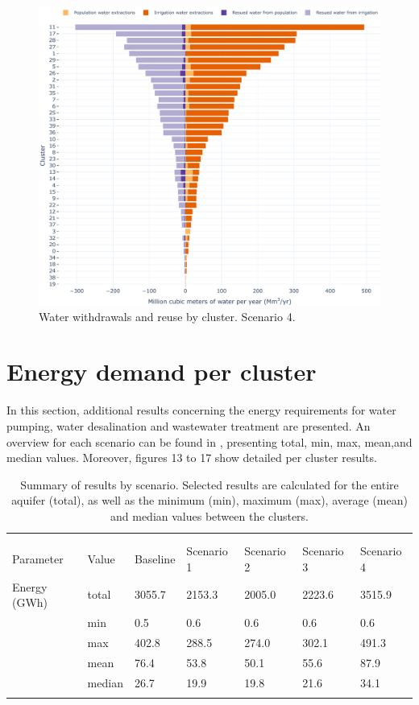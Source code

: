 \documentclass[12pt]{iopart}
\begin{document}
\begin{figure}[!h]
	\centering
	\includegraphics[width=\textwidth]{Scenario4Water}
	\caption{Water withdrawals and reuse by cluster. Scenario 4.}
	\label{fig:Scenario4Water}
\end{figure}

\clearpage
\section{Energy demand per cluster}
In this section, additional results concerning the energy requirements for water pumping, water desalination and wastewater treatment are presented. An overview for each scenario can be found in , presenting total, min, max, mean,and median values. Moreover, figures 13 to 17 show detailed per cluster results.
\begin{table}[!ht]
	\caption{\label{tbl:resultsenergy}Summary of results by scenario. Selected results are calculated for the entire aquifer (total), as well as the minimum (min), maximum (max), average (mean) and median values between the clusters.}
	\footnotesize
	\lineup
	\begin{tabular*}{\textwidth}{@{}*{7}{l}}
		\br
		&        & \centre{5}{Scenario} \\
		\ns
		&        & \crule{5} \\
		Parameter & Value  &  Baseline &  Scenario 1 &  Scenario 2 &  Scenario 3 &  Scenario 4 \\
		\mr
		Energy (GWh) & total &    3055.7 &      2153.3 &      2005.0 &      2223.6 &      3515.9 \\
		& min &       0.5 &         0.6 &         0.6 &         0.6 &         0.6 \\
		& max &     402.8 &       288.5 &       274.0 &       302.1 &       491.3 \\
		& mean &      76.4 &        53.8 &        50.1 &        55.6 &        87.9 \\
		& median &      26.7 &        19.9 &        19.8 &        21.6 &        34.1 \\
		\br
	\end{tabular*}
\end{table}
\end{document}
